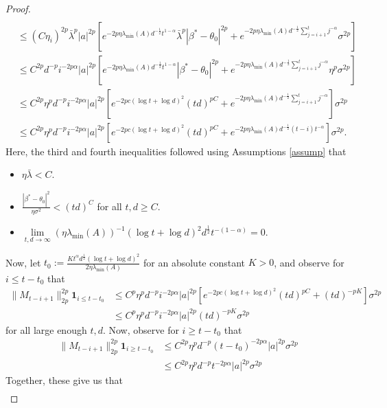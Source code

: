 \documentclass[11pt, reqno,english]{amsart}
\begin{document}
\begin{proof}
\begin{align*}
    \\
    &\leq (C\eta_i)^{2p}\bar{\lambda}^p|a|^{2p}[e^{-2p\eta \lambda_{\min}(A)d^{-\frac{1}{2}}t^{1-\alpha}}\bar{\lambda}^{p}|\beta^* - \theta_0|^{2p} + e^{-2p\eta \lambda_{\min}(A)d^{-\frac{1}{2}}\sum_{j = i+1}^t j^{-\alpha}}\sigma^{2p}]
    \\
    &\leq C^{2p}d^{-p}i^{-2p\alpha}|a|^{2p}[e^{-2p\eta \lambda_{\min}(A)d^{-\frac{1}{2}}t^{1-\alpha}}|\beta^* - \theta_0|^{2p} + e^{-2p\eta \lambda_{\min}(A)d^{-\frac{1}{2}}\sum_{j = i+1}^t j^{-\alpha}}\eta^p\sigma^{2p}]
    \\
    &\leq C^{2p}\eta^pd^{-p}i^{-2p\alpha}|a|^{2p}[e^{-2pc(\log t + \log d)^{2}}(td)^{pC}+ e^{-2p\eta \lambda_{\min}(A)d^{-\frac{1}{2}}\sum_{j = i+1}^tj^{-\alpha}}]\sigma^{2p}
    \\
    &\leq C^{2p}\eta^pd^{-p}i^{-2p\alpha}|a|^{2p}[e^{-2pc(\log t + \log d)^{2}}(td)^{pC}+ e^{-2p\eta \lambda_{\min}(A)d^{-\frac{1}{2}}(t-i)t^{-\alpha}}]\sigma^{2p}.
\end{align*}
Here, the third and fourth inequalities followed using Assumptions \ref{assump} that 
\begin{itemize}
    \item $\eta \bar{\lambda} < C$. 
    \item $\frac{|\beta^* - \theta_0|^2}{\eta \sigma^2} < (td)^{C}$ for all $t,d \geq C$.
    \item $\lim\limits_{t,d \to \infty} (\eta \lambda_{\min}(A))^{-1} (\log t + \log d)^2 d^{\frac{1}{2}}t^{-(1 - \alpha)} = 0$.
\end{itemize}
Now, let $t_0 := \frac{Kt^{\alpha}d^{\frac{1}{2}}(\log t + \log d)^2}{2\eta \lambda_{\min}(A)}$ for an absolute constant $K > 0$, and observe for $i \leq t-t_0$ that
\begin{align*}
    \|M_{t-i+1}\|^{2p}_{2p} \mathbf{1}_{i  \leq t-t_0} &\leq C^p \eta^p d^{-p}i^{-2p\alpha}|a|^{2p}[e^{-2pc(\log t + \log d)^2}(td)^{pC} + (td)^{-pK}]\sigma^{2p}
    \\
    &\leq C^p \eta^p d^{-p}i^{-2p\alpha}|a|^{2p}(td)^{-pK}\sigma^{2p}
\end{align*}
for all large enough $t,d$. Now, observe for $i \geq t-t_0$ that
\begin{align*}
    \|M_{t-i+1}\|^{2p}_{2p} \mathbf{1}_{i  \geq t-t_0} &\leq C^{2p}\eta^p d^{-p}(t-t_0)^{-2p\alpha}|a|^{2p}\sigma^{2p}
    \\
    &\leq C^{2p}\eta^p d^{-p}t^{-2p\alpha}|a|^{2p}\sigma^{2p}
\end{align*}
Together, these give us that
\begin{align*}

\end{align*}
\end{proof}
\end{document}
